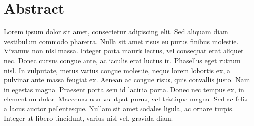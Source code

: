 \chapter*{Abstract} %


Lorem ipsum dolor sit amet, consectetur adipiscing elit. Sed aliquam diam vestibulum commodo pharetra. Nulla sit amet risus eu purus finibus molestie. Vivamus non nisl massa. Integer porta mauris lectus, vel consequat erat aliquet nec. Donec cursus congue ante, ac iaculis erat luctus in. Phasellus eget rutrum nisl. In vulputate, metus varius congue molestie, neque lorem lobortis ex, a pulvinar ante massa feugiat ex. Aenean ac congue risus, quis convallis justo. Nam in egestas magna. Praesent porta sem id lacinia porta. Donec nec tempus ex, in elementum dolor. Maecenas non volutpat purus, vel tristique magna. Sed ac felis a lacus auctor pellentesque. Nullam sit amet sodales ligula, ac ornare turpis. Integer at libero tincidunt, varius nisl vel, gravida diam.


